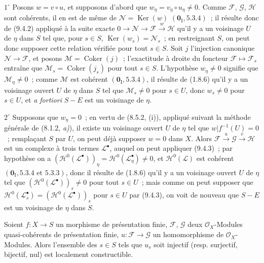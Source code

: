 $1^\circ$ Posons $w=v\circ u$, et supposons d'abord que
$w_\eta=v_\eta\circ u_\eta\neq0$. Comme $\mathcal F$, $\mathcal G$,
$\mathcal H$ sont cohérents, il en est de même de
$\mathcal N=\operatorname{Ker}(w)$ $(\mathbf 0_{\mathrm I},5.3.4)$~; il
résulte donc de (9.4.2) appliqué à la suite exacte
$0\to\mathcal N\to\mathcal F\xrightarrow{w}\mathcal H$ qu'il y a un
voisinage $U$ de $\eta$ dans $S$ tel que, pour $s\in S$,
$\operatorname{Ker}(w_s)=\mathcal N_s$~; en restreignant $S$, on peut donc
supposer cette relation vérifiée pour tout $s\in S$. Soit $j$ l'injection
canonique $\mathcal N\to\mathcal F$, et posons
$\mathcal M=\operatorname{Coker}(j)$~; l'exactitude à droite du foncteur
$\mathcal F\mapsto\mathcal F_s$ entraîne que
$\mathcal M_s=\operatorname{Coker}(j_s)$ pour tout $s\in S$. L'hypothèse
$w_\eta\neq0$ signifie que $\mathcal M_\eta\neq0$~; comme $\mathcal M$ est
cohérent $(\mathbf 0_{\mathrm I},5.3.4)$, il résulte de (1.8.6) qu'il y a un
voisinage ouvert $U$ de $\eta$ dans $S$ tel que $\mathcal M_s\neq0$ pour
$s\in U$, donc $w_s\neq0$ pour $s\in U$, et \emph{a fortiori} $S-E$ est un
voisinage de $\eta$.

$2^\circ$ Supposons que $w_\eta=0$~; en vertu de (8.5.2, (i)), appliqué
suivant la méthode générale de (8.1.2, \emph{a)}), il existe un voisinage
ouvert $U$ de $\eta$ tel que $w|f^{-1}(U)=0$~; remplaçant $S$ par $U$, on peut
déjà supposer $w=0$ dans $X$. Alors
$\mathcal F\xrightarrow{u}\mathcal G\xrightarrow{v}\mathcal H$ est un
complexe à trois termes $\mathcal L^\bullet$, auquel on peut appliquer
(9.4.3)~; par hypothèse on a
$(\mathcal H^0(\mathcal L^\bullet))_\eta=
\mathcal H^0(\mathcal L^\bullet_\eta)\neq0$, et
$\mathcal H^0(\mathcal L)$ est cohérent
$(\mathbf 0_{\mathrm I},5.3.4\text{ et }5.3.3)$, donc il résulte de (1.8.6)
qu'il y a un voisinage ouvert $U$ de $\eta$ tel que
$(\mathcal H^0(\mathcal L^\bullet))_s\neq0$ pour tout $s\in U$~; mais comme
on peut supposer que
$\mathcal H^0(\mathcal L_s^\bullet)=(\mathcal H^0(\mathcal L^\bullet))_s$
pour $s\in U$ par (9.4.3), on voit de nouveau que $S-E$ est un voisinage de
$\eta$ dans $S$.


\begin{corollary}[9.4.5]
\label{IV.9.4.5-fr}
Soient $f:X\to S$ un morphisme de présentation finie, $\mathcal F$,
$\mathcal G$ deux $\mathcal O_X$-Modules quasi-cohérents de présentation finie,
$u:\mathcal F\to\mathcal G$ un homomorphisme de $\mathcal O_X$-Modules.
Alors l'ensemble des $s\in S$ tels que $u_s$ soit injectif
\textnormal{(}resp. surjectif, bijectif, nul\textnormal{)} est localement
constructible.
\end{corollary}

